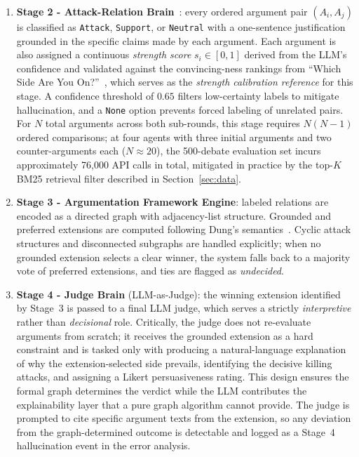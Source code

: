 \documentclass[11pt,twocolumn,letterpaper]{article}
\newcommand{\DDOSample}{500}
\begin{document}
\begin{enumerate}
  \item \textbf{Stage 2 - Attack-Relation Brain}~\citep{ozaki2025llmdebate}:
        every ordered argument pair $(A_i, A_j)$ is classified as
        \texttt{Attack}, \texttt{Support}, or \texttt{Neutral} with a
        one-sentence justification grounded in the specific claims made by
        each argument. Each argument is also assigned a continuous
        \textit{strength score} $s_i \in [0,1]$ derived from the LLM's
        confidence and validated against the convincing-ness rankings from
        ``Which Side Are You On?''~\citep{li2024whichside}, which serves as
        the \textit{strength calibration reference} for this stage.
        A confidence threshold of $0.65$ filters low-certainty labels to
        mitigate hallucination, and a \texttt{None} option prevents forced
        labeling of unrelated pairs.
        For $N$ total arguments across both sub-rounds, this stage requires
        $N(N-1)$ ordered comparisons; at four agents with three initial
        arguments and two counter-arguments each ($N \approx 20$),
        the \DDOSample-debate evaluation set incurs approximately
        76{,}000 API calls in total, mitigated in practice by the
        top-$K$ BM25 retrieval filter described in Section~\ref{sec:data}.

  \item \textbf{Stage 3 - Argumentation Framework Engine}: labeled
        relations are encoded as a directed graph with adjacency-list
        structure. Grounded and preferred extensions are computed following
        Dung's semantics~\citep{dung1995}. Cyclic attack structures and
        disconnected subgraphs are handled explicitly; when no grounded
        extension selects a clear winner, the system falls back to a
        majority vote of preferred extensions, and ties are flagged as
        \textit{undecided}.

  \item \textbf{Stage 4 - Judge Brain} (LLM-as-Judge): the winning
        extension identified by Stage~3 is passed to a final LLM judge,
        which serves a strictly \textit{interpretive} rather than
        \textit{decisional} role. Critically, the judge does not re-evaluate
        arguments from scratch; it receives the grounded extension as a
        hard constraint and is tasked only with producing a natural-language
        explanation of why the extension-selected side prevails, identifying
        the decisive killing attacks, and assigning a Likert persuasiveness
        rating. This design ensures the formal graph determines the verdict
        while the LLM contributes the explainability layer that a pure graph
        algorithm cannot provide. The judge is prompted to cite specific
        argument texts from the extension, so any deviation from the
        graph-determined outcome is detectable and logged as a Stage~4
        hallucination event in the error analysis.
\end{enumerate}
\end{document}
